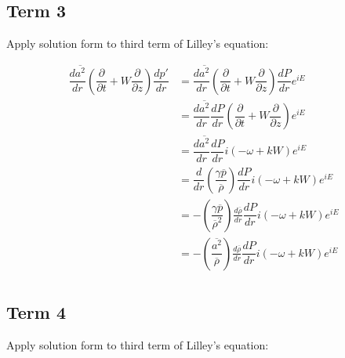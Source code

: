 \documentclass[]{aiaa-tc}%
\begin{document}
\subsection{Term 3}

Apply solution form to third term of Lilley's equation:


\begin{equation}
\begin{split}
\dfrac{d \overline{a^2}}{dr} \left( \dfrac{\partial}{\partial t} + W \dfrac{\partial}{\partial z} \right) \dfrac{dp'}{dr}
&= \dfrac{d \overline{a^2}}{dr}
   \left( \dfrac{\partial}{\partial t} + W \dfrac{\partial}{\partial z} \right)
   \dfrac{dP}{dr} e^{iE}  \\
&= \dfrac{d \overline{a^2}}{dr} \dfrac{dP}{dr}
   \left( \dfrac{\partial}{\partial t} + W \dfrac{\partial}{\partial z} \right) e^{iE} \\
&= \dfrac{d \overline{a^2}}{dr} \dfrac{dP}{dr}
    i(-\omega + kW) e^{iE} \\
&= \dfrac{d}{dr} \left(\dfrac{\gamma \overline{p}}{\overline{\rho}}\right)
    \dfrac{dP}{dr} i(-\omega + kW) e^{iE} \\
&= -\left(\dfrac{\gamma \overline{p}}{\overline{\rho}^2}\right) \frac{d \overline{\rho}}{dr}
    \dfrac{dP}{dr} i(-\omega + kW) e^{iE} \\
&= -\left(\dfrac{\overline{a^2}}{\overline{\rho}}\right) \frac{d \overline{\rho}}{dr}
    \dfrac{dP}{dr} i(-\omega + kW) e^{iE} \\
\end{split}
\end{equation}






\subsection{Term 4}

Apply solution form to third term of Lilley's equation:
\end{document}
